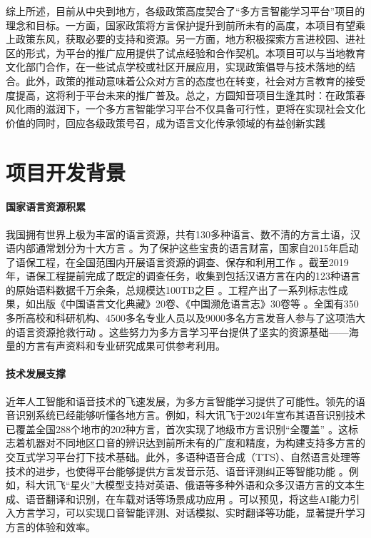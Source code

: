 综上所述，目前从中央到地方，各级政策高度契合了“多方言智能学习平台”项目的理念和目标。一方面，国家政策将方言保护提升到前所未有的高度，本项目有望乘上政策东风，获取必要的支持和资源。另一方面，地方积极探索方言进校园、进社区的形式，为平台的推广应用提供了试点经验和合作契机。本项目可以与当地教育文化部门合作，在一些试点学校或社区开展应用，实现政策倡导与技术落地的结合。此外，政策的推动意味着公众对方言的态度也在转变，社会对方言教育的接受度提高，这将利于平台未来的推广普及。总之，方圆知音项目生逢其时：在政策春风化雨的滋润下，一个多方言智能学习平台不仅具备可行性，更将在实现社会文化价值的同时，回应各级政策号召，成为语言文化传承领域的有益创新实践 

\section{项目开发背景}
\paragraph{国家语言资源积累}
我国拥有世界上极为丰富的语言资源，共有130多种语言、数不清的方言土语，汉语内部通常划分为十大方言 。为了保护这些宝贵的语言财富，国家自2015年启动了语保工程，在全国范围内开展语言资源的调查、保存和利用工作 。截至2019年，语保工程提前完成了既定的调查任务，收集到包括汉语方言在内的123种语言的原始语料数据千万余条，总规模达100TB之巨 。工程产出了一系列标志性成果，如出版《中国语言文化典藏》20卷、《中国濒危语言志》30卷等 。全国有350多所高校和科研机构、4500多名专业人员以及9000多名方言发音人参与了这项浩大的语言资源抢救行动  。这些努力为多方言学习平台提供了坚实的资源基础——海量的方言有声资料和专业研究成果可供参考利用。
\paragraph{技术发展支撑}
近年人工智能和语音技术的飞速发展，为多方言智能学习提供了可能性。领先的语音识别系统已经能够听懂各地方言。例如，科大讯飞于2024年宣布其语音识别技术已覆盖全国288个地市的202种方言，首次实现了地级市方言识别“全覆盖” 。这标志着机器对不同地区口音的辨识达到前所未有的广度和精度，为构建支持多方言的交互式学习平台打下技术基础。此外，多语种语音合成（TTS）、自然语言处理等技术的进步，也使得平台能够提供方言发音示范、语音评测纠正等智能功能 。例如，科大讯飞“星火”大模型支持对英语、俄语等多种外语和众多汉语方言的文本生成、语音翻译和识别，在车载对话等场景成功应用 。可以预见，将这些AI能力引入方言学习，可以实现口音智能评测、对话模拟、实时翻译等功能，显著提升学习方言的体验和效率。
